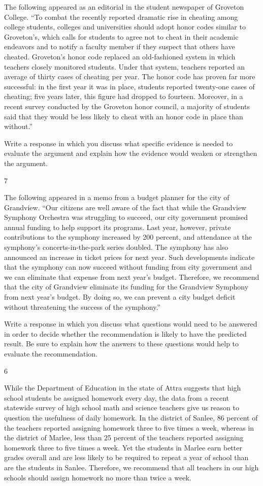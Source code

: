 \documentclass[]{article}
\begin{document}
The following appeared as an editorial in the student newspaper of
Groveton College. ``To combat the recently reported dramatic rise in
cheating among college students, colleges and universities should adopt
honor codes similar to Groveton's, which calls for students to agree not
to cheat in their academic endeavors and to notify a faculty member if
they suspect that others have cheated. Groveton's honor code replaced an
old-fashioned system in which teachers closely monitored students. Under
that system, teachers reported an average of thirty cases of cheating
per year. The honor code has proven far more successful: in the first
year it was in place, students reported twenty-one cases of cheating;
five years later, this figure had dropped to fourteen. Moreover, in a
recent survey conducted by the Groveton honor council, a majority of
students said that they would be less likely to cheat with an honor code
in place than without.''

Write a response in which you discuss what specific evidence is needed
to evaluate the argument and explain how the evidence would weaken or
strengthen the argument.

7

The following appeared in a memo from a budget planner for the city of
Grandview. ``Our citizens are well aware of the fact that while the
Grandview Symphony Orchestra was struggling to succeed, our city
government promised annual funding to help support its programs. Last
year, however, private contributions to the symphony increased by 200
percent, and attendance at the symphony's concerts-in-the-park series
doubled. The symphony has also announced an increase in ticket prices
for next year. Such developments indicate that the symphony can now
succeed without funding from city government and we can eliminate that
expense from next year's budget. Therefore, we recommend that the city
of Grandview eliminate its funding for the Grandview Symphony from next
year's budget. By doing so, we can prevent a city budget deficit without
threatening the success of the symphony.''

Write a response in which you discuss what questions would need to be
answered in order to decide whether the recommendation is likely to have
the predicted result. Be sure to explain how the answers to these
questions would help to evaluate the recommendation.

6

While the Department of Education in the state of Attra suggests that
high school students be assigned homework every day, the data from a
recent statewide survey of high school math and science teachers give us
reason to question the usefulness of daily homework. In the district of
Sanlee, 86 percent of the teachers reported assigning homework three to
five times a week, whereas in the district of Marlee, less than 25
percent of the teachers reported assigning homework three to five times
a week. Yet the students in Marlee earn better grades overall and are
less likely to be required to repeat a year of school than are the
students in Sanlee. Therefore, we recommend that all teachers in our
high schools should assign homework no more than twice a week.
\end{document}
